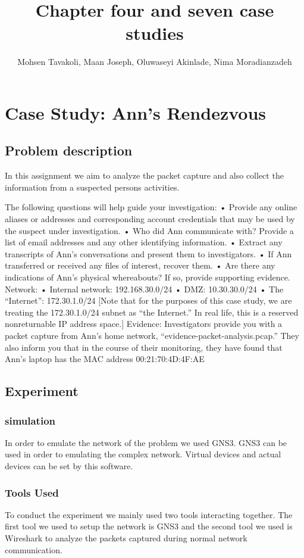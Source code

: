 \documentclass{article}
\title{Chapter four and seven case studies}
\author{Mohsen Tavakoli, Maan Joseph, Oluwaseyi Akinlade, Nima Moradianzadeh}
\begin{document}
\maketitle
\section{Case Study: Ann’s Rendezvous}
\subsection{Problem description}
In this assignment we aim to analyze the packet capture and also collect the information from a suspected persons activities.
 
The following questions will help guide your investigation:
• Provide any online aliases or addresses and corresponding account credentials that
may be used by the suspect under investigation.
• Who did Ann communicate with? Provide a list of email addresses and any other
identifying information.
• Extract any transcripts of Ann’s conversations and present them to investigators.
• If Ann transferred or received any files of interest, recover them.
• Are there any indications of Ann’s physical whereabouts? If so, provide supporting
evidence.
Network:
• Internal network: 192.168.30.0/24
• DMZ: 10.30.30.0/24
• The “Internet”: 172.30.1.0/24 [Note that for the purposes of this case study, we are
treating the 172.30.1.0/24 subnet as “the Internet.” In real life, this is a reserved nonreturnable
IP address space.]
Evidence: Investigators provide you with a packet capture from Ann’s home network,
“evidence-packet-analysis.pcap.” They also inform you that in the course of their monitoring,
they have found that Ann’s laptop has the MAC address 00:21:70:4D:4F:AE
\subsection{Experiment}
\subsubsection{simulation}
In order to emulate the network of the problem we used GNS3. GNS3 can be used in order to emulating the complex network. Virtual devices and actual devices can be set by this software\cite{amyot2014system}.


\subsubsection{Tools Used}
To conduct the experiment we mainly used two tools interacting together. The first tool we used to setup the network is GNS3 and the second tool we used is Wireshark to analyze the packets captured during normal network communication.
\end{document}
